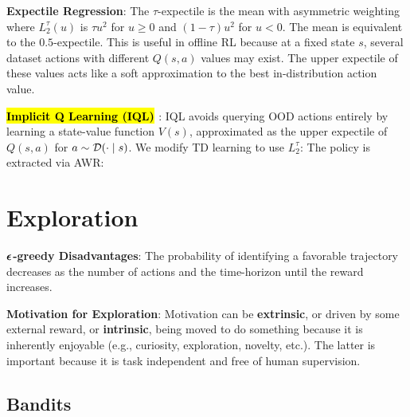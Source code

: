 \documentclass{article}
\begin{document}
  \textbf{Expectile Regression}: The $\tau$-expectile is the mean with asymmetric weighting
  where $L_2^\tau(u)$ is $\tau u^2$ for $u\geq 0$ and $(1-\tau)u^2$ for $u<0$. The mean is equivalent to the $0.5$-expectile. This is useful in offline RL because at a fixed state $s$, several dataset actions with different $Q(s,a)$ values may exist. The upper expectile of these values acts like a soft approximation to the best in-distribution action value.

  \textbf{\hl{Implicit Q Learning (IQL)} \cite{kostrikov2021offline}}: IQL avoids querying OOD actions entirely by learning a state-value function $V(s)$, approximated as the upper expectile of $Q(s,a)$ for $a\sim\mathcal{D}(\cdot\mid s)$. We modify TD learning to use $L_2^\tau$:
  The policy is extracted via AWR:

\section{Exploration}

  \textbf{$\boldsymbol{\epsilon}$-greedy Disadvantages}: The probability of identifying a favorable trajectory decreases as the number of actions and the time-horizon until the reward increases.

  \textbf{Motivation for Exploration}: Motivation can be \textbf{extrinsic}, or driven by some external reward, or \textbf{intrinsic}, being moved to do something because it is inherently enjoyable (e.g., curiosity, exploration, novelty, etc.). The latter is important because it is task independent and free of human supervision.

\subsection{Bandits}
\end{document}
